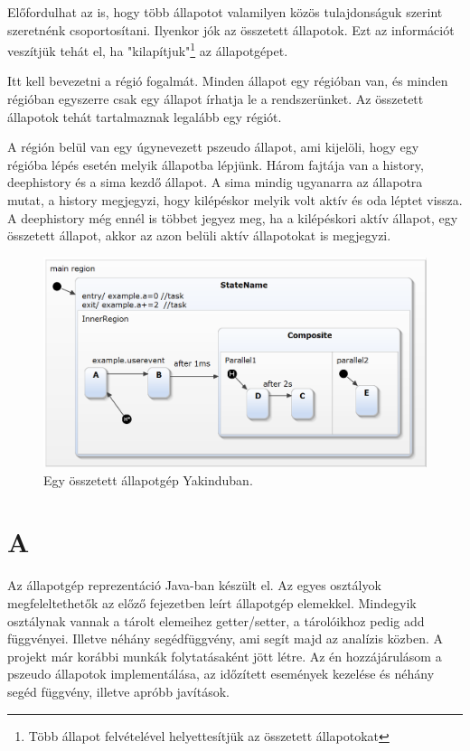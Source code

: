 Előfordulhat az is, hogy több állapotot valamilyen közös tulajdonságuk szerint szeretnénk csoportosítani. Ilyenkor jók az összetett állapotok.\label{infovesztes} Ezt az információt veszítjük tehát el, ha "kilapítjuk"\footnote{Több állapot felvételével helyettesítjük az összetett állapotokat} az állapotgépet.

Itt kell bevezetni a régió fogalmát. Minden állapot egy régióban van, és minden régióban egyszerre csak egy állapot írhatja le a rendszerünket. Az összetett állapotok tehát tartalmaznak legalább egy régiót.

A régión belül van egy úgynevezett pszeudo állapot, ami kijelöli, hogy egy régióba lépés esetén melyik állapotba lépjünk. Három fajtája van a history, deephistory és a sima kezdő állapot. A sima mindig ugyanarra az állapotra mutat, a history megjegyzi, hogy kilépéskor melyik volt aktív és oda léptet vissza. A deephistory még ennél is többet jegyez meg, ha a kilépéskori aktív állapot, egy összetett állapot, akkor az azon belüli aktív állapotokat is megjegyzi.

\begin{figure} [!ht]
	\centering
	\includegraphics[width=150mm, keepaspectratio]{figures/statechart.png}
	\caption{\label{fig:statechart}Egy összetett állapotgép Yakinduban.}
\end{figure}


\section{A {\thetaSc}}
\label{sec:thetaleiras}

Az állapotgép reprezentáció Java-ban készült el. Az egyes osztályok megfeleltethetők az előző fejezetben leírt állapotgép elemekkel. Mindegyik osztálynak vannak a tárolt elemeihez getter/setter, a tárolóikhoz pedig add függvényei. Illetve néhány segédfüggvény, ami segít majd az analízis közben. A projekt már korábbi munkák folytatásaként jött létre. Az én hozzájárulásom a pszeudo állapotok implementálása, az időzített események kezelése és néhány segéd függvény, illetve apróbb javítások.


